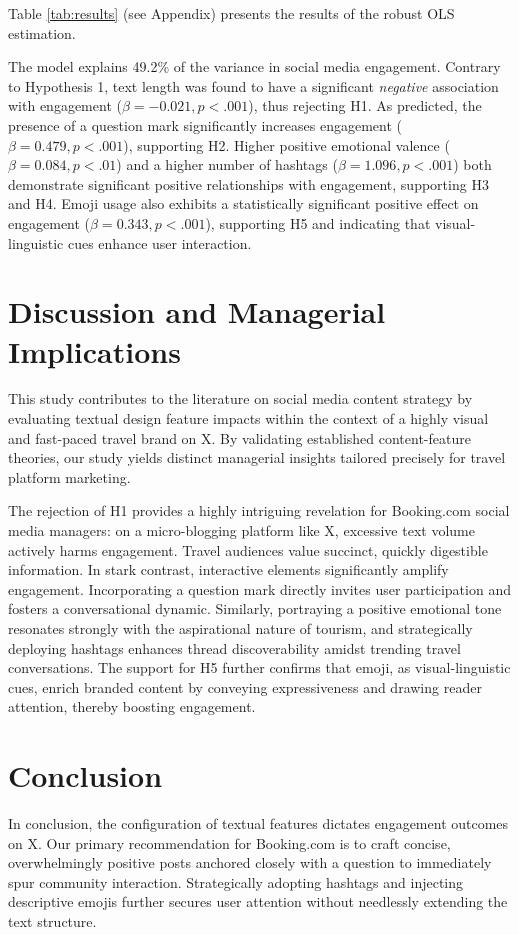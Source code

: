 \documentclass[12pt,a4paper,fontset=none]{ctexart}
\begin{document}
Table \ref{tab:results} (see Appendix) presents the results of the robust OLS estimation.

The model explains 49.2\% of the variance in social media engagement. Contrary to Hypothesis 1, text length was found to have a significant \textit{negative} association with engagement ($\beta = -0.021, p < .001$), thus rejecting H1. As predicted, the presence of a question mark significantly increases engagement ($\beta = 0.479, p < .001$), supporting H2. Higher positive emotional valence ($\beta = 0.084, p < .01$) and a higher number of hashtags ($\beta = 1.096, p < .001$) both demonstrate significant positive relationships with engagement, supporting H3 and H4. Emoji usage also exhibits a statistically significant positive effect on engagement ($\beta = 0.343, p < .001$), supporting H5 and indicating that visual-linguistic cues enhance user interaction. 

\section{Discussion and Managerial Implications}
This study contributes to the literature on social media content strategy by evaluating textual design feature impacts within the context of a highly visual and fast-paced travel brand on X. By validating established content-feature theories, our study yields distinct managerial insights tailored precisely for travel platform marketing.

The rejection of H1 provides a highly intriguing revelation for Booking.com social media managers: on a micro-blogging platform like X, excessive text volume actively harms engagement. Travel audiences value succinct, quickly digestible information. In stark contrast, interactive elements significantly amplify engagement. Incorporating a question mark directly invites user participation and fosters a conversational dynamic. Similarly, portraying a positive emotional tone resonates strongly with the aspirational nature of tourism, and strategically deploying hashtags enhances thread discoverability amidst trending travel conversations. The support for H5 further confirms that emoji, as visual-linguistic cues, enrich branded content by conveying expressiveness and drawing reader attention, thereby boosting engagement.

\section{Conclusion}
In conclusion, the configuration of textual features dictates engagement outcomes on X. Our primary recommendation for Booking.com is to craft concise, overwhelmingly positive posts anchored closely with a question to immediately spur community interaction. Strategically adopting hashtags and injecting descriptive emojis further secures user attention without needlessly extending the text structure.
\end{document}
